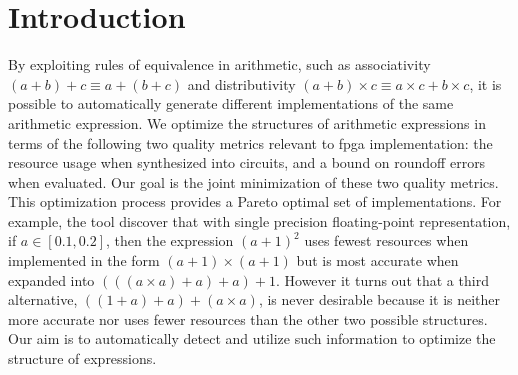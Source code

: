 \section{Introduction}
\label{so:sec:introduction}


By exploiting rules of equivalence in arithmetic, such as associativity $(a
+ b) + c \equiv a + (b + c)$ and distributivity $(a + b) \times c \equiv a
\times c + b \times c$, it is possible to automatically generate different
implementations of the same arithmetic expression.  We optimize the structures
of arithmetic expressions in terms of the following two quality metrics
relevant to \gls{fpga} implementation: the resource usage when synthesized into
circuits, and a bound on roundoff errors when evaluated. Our goal is the joint
minimization of these two quality metrics.  This optimization process provides
a Pareto optimal set of implementations.  For example, the tool discover that
with single precision floating-point representation, if $a \in [0.1, 0.2]$,
then the expression ${(a + 1)}^2$ uses fewest resources when implemented in the
form $(a + 1) \times (a + 1)$ but is most accurate when expanded into $(((a
\times a) + a) + a) + 1$.  However it turns out that a third alternative,
$((1 + a) + a) + (a \times a)$, is never desirable because it is neither more
accurate nor uses fewer resources than the other two possible structures. Our
aim is to automatically detect and utilize such information to optimize the
structure of expressions.

